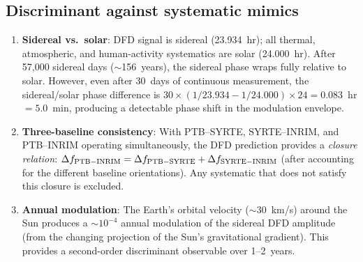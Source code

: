 \documentclass[11pt]{article}
\begin{document}
\subsection{Discriminant against systematic mimics}

\begin{enumerate}
\item \textbf{Sidereal vs.\ solar}: DFD signal is sidereal (23.934~hr);
  all thermal, atmospheric, and human-activity systematics are solar
  (24.000~hr). After 57,000 sidereal days ($\sim$156~years), the
  sidereal phase wraps fully relative to solar. However, even after
  30~days of continuous measurement, the sidereal/solar phase
  difference is $30 \times (1/23.934 - 1/24.000) \times 24 = 0.083$~hr
  $= 5.0$~min, producing a detectable phase shift in the modulation
  envelope.

\item \textbf{Three-baseline consistency}: With PTB--SYRTE, SYRTE--INRIM,
  and PTB--INRIM operating simultaneously, the DFD prediction provides
  a \emph{closure relation}: $\Delta f_{\rm PTB-INRIM} = \Delta f_{\rm
  PTB-SYRTE} + \Delta f_{\rm SYRTE-INRIM}$ (after accounting for the
  different baseline orientations). Any systematic that does not satisfy
  this closure is excluded.

\item \textbf{Annual modulation}: The Earth's orbital velocity
  ($\sim$30~km/s) around the Sun produces a $\sim 10^{-4}$ annual
  modulation of the sidereal DFD amplitude (from the changing
  projection of the Sun's gravitational gradient). This provides a
  second-order discriminant observable over 1--2~years.
\end{enumerate}
\end{document}
